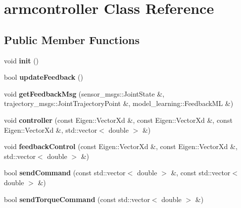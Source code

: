 \hypertarget{classarmcontroller}{}\section{armcontroller Class Reference}
\label{classarmcontroller}
\subsection*{Public Member Functions}
\begin{DoxyCompactItemize}
\item 
void {\bfseries init} ()\hypertarget{classarmcontroller_a45794311f7ab89c67fe7423e07ea19d7}{}\label{classarmcontroller_a45794311f7ab89c67fe7423e07ea19d7}

\item 
bool {\bfseries update\+Feedback} ()\hypertarget{classarmcontroller_a3cba85249ae1746aeac14d12b68becdc}{}\label{classarmcontroller_a3cba85249ae1746aeac14d12b68becdc}

\item 
void {\bfseries get\+Feedback\+Msg} (sensor\+\_\+msgs\+::\+Joint\+State \&, trajectory\+\_\+msgs\+::\+Joint\+Trajectory\+Point \&, model\+\_\+learning\+::\+Feedback\+ML \&)\hypertarget{classarmcontroller_af1970af350bf0902f57bdbf4089f3b13}{}\label{classarmcontroller_af1970af350bf0902f57bdbf4089f3b13}

\item 
void {\bfseries controller} (const Eigen\+::\+Vector\+Xd \&, const Eigen\+::\+Vector\+Xd \&, const Eigen\+::\+Vector\+Xd \&, std\+::vector$<$ double $>$ \&)\hypertarget{classarmcontroller_a5d9414eb9b6c92b3f19f177c44f9f6f1}{}\label{classarmcontroller_a5d9414eb9b6c92b3f19f177c44f9f6f1}

\item 
void {\bfseries feedback\+Control} (const Eigen\+::\+Vector\+Xd \&, const Eigen\+::\+Vector\+Xd \&, std\+::vector$<$ double $>$ \&)\hypertarget{classarmcontroller_a2385c8f95fd011e1206d2730615a4fad}{}\label{classarmcontroller_a2385c8f95fd011e1206d2730615a4fad}

\item 
bool {\bfseries send\+Command} (const std\+::vector$<$ double $>$ \&, const std\+::vector$<$ double $>$ \&)\hypertarget{classarmcontroller_a146f6d320cd7641c9fbc8c7b014a7ceb}{}\label{classarmcontroller_a146f6d320cd7641c9fbc8c7b014a7ceb}

\item 
bool {\bfseries send\+Torque\+Command} (const std\+::vector$<$ double $>$ \&)\hypertarget{classarmcontroller_adb671e988673c3750f3c846cac593eba}{}\label{classarmcontroller_adb671e988673c3750f3c846cac593eba}


\end{DoxyCompactItemize}
